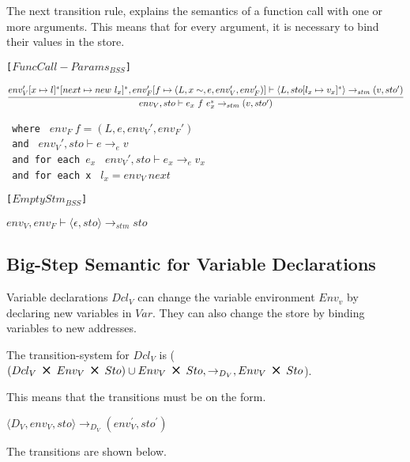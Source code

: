 The next transition rule, explains the semantics of a function call with one or more arguments.
This means that for every argument, it is necessary to bind their values in the store.

\texttt{[$FuncCall-Params_{BSS}$]}\\
\begin{center}
	\begin{math}
	\cfrac
	{env_V'[x \mapsto l]^*[next \mapsto new\ l_x]^*, env_F'[f \mapsto (L, x\sim, e, env_V', env_F')] \vdash \langle L, sto[l_x \mapsto v_x]^* \rangle \rightarrow_{stm} (v, sto')}
	{env_V, sto \vdash e_x\ f\ e_x^* \rightarrow_{stm} (v, sto')}
	\end{math}
	
	\texttt{ where } $env_F\ f = (L, e, env_V', env_F')$\\
	\texttt{ and } $ env_V', sto \vdash e \rightarrow_{e} v$\\
	\texttt{ and for each $e_x$ } $env_V', sto \vdash e_x \rightarrow_{e} v_x$ \\
	\texttt{ and for each x } $l_x = env_V\ next$ 
\end{center}

\texttt{[$EmptyStm_{BSS}$]}\\
\begin{center}
	\begin{math}
		{env_V, env_F \vdash \langle \epsilon, sto \rangle \rightarrow_{stm} sto}
	\end{math}
\end{center}

\subsection{Big-Step Semantic for Variable Declarations}
Variable declarations $Dcl_V$ can change the variable environment $Env_v$ by declaring new variables in $Var$.
They can also change the store by binding variables to new addresses.

The transition-system for $Dcl_V$ is ($(Dcl_V\ \Cross\ Env_V\ \Cross\ Sto) \cup Env_V\ \Cross\ Sto, \rightarrow_{D_{V}}, Env_V\ \Cross\ Sto$).

This means that the transitions must be on the form.

\begin{center}
	$\langle D_V,env_V,sto \rangle \rightarrow_{D_V} (env_V^{'} , sto^{'})$
\end{center}

The transitions are shown below.

